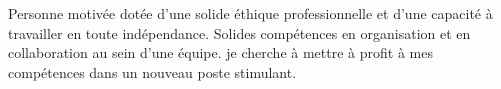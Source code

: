 \par{
Personne motivée dotée d'une solide éthique professionnelle et d'une capacité à travailler en toute indépendance. Solides compétences en organisation et en collaboration au sein d'une équipe. je cherche à mettre à profit à mes compétences dans un nouveau poste stimulant.
}